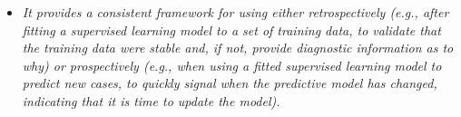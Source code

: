 \documentclass[twoside,11pt]{article}
\begin{document}
\begin{itemize}
\item
\textit{It provides a consistent framework for using either retrospectively (e.g., after fitting a supervised learning model to a set of training data, to validate that the training data were stable and, if not, provide diagnostic information as to why) or prospectively (e.g., when using a fitted supervised learning model to predict new cases, to quickly signal when the predictive model has changed, indicating that it is time to update the model).}
\end{itemize}




\end{document}
